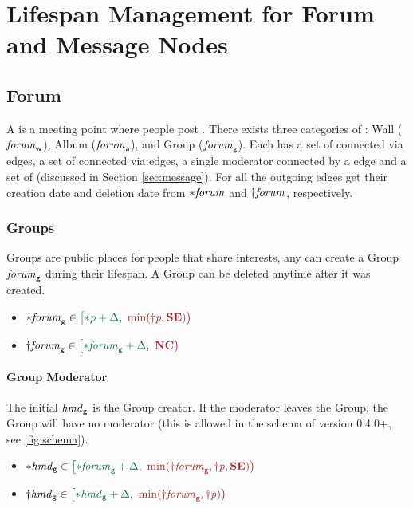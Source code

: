 
\section{Lifespan Management for Forum and Message Nodes}

\subsection{Forum}
\label{sec:forum}
\label{sec:hasModerator}

A \tForum is a meeting point where people post \tMessages.
There exists three categories of \tForums:
Wall ($\mathit{forum}_\textsf{w}$),
Album ($\mathit{forum}_\textsf{a}$),
and Group ($\mathit{forum}_\textsf{g}$).
Each \tForum has a set of \tPersons connected via \tHasMember edges, a set of \tTags connected via \tHasTag edges, a single moderator connected by a \tHasModerator edge and a set of \tMessages (discussed in Section \ref{sec:message}).
For all \tForums the outgoing \tHasTag edges get their creation date and deletion date from ${\ast}\mathit{\mathit{forum}}$ and ${\dagger}\mathit{\mathit{forum}}$, respectively.

\subsubsection{Groups}
Groups are public places for people that share interests, any \tPerson can create a Group $\mathit{forum}_\textsf{g}$ during their lifespan. A Group can be deleted anytime after it was created.
\begin{itemize}
    \item $\varc{\eForum}_{\mathsf{g}} \in \interval{\varc{\ePerson} + \Delta}{\min (\vard{\ePerson}, \xSE)}$
    \item $\vard{\eForum}_{\mathsf{g}} \in \interval{\varc{\eForum}_{\mathsf{g}} + \Delta}{\xNC}$
\end{itemize}

\paragraph{Group Moderator}
The initial \tHasModerator $\mathit{hmd}_{\mathsf{g}}$ is the Group creator. If the moderator leaves the Group, the Group will have no moderator (this is allowed in the schema of version 0.4.0+, see \autoref{fig:schema}).
\begin{itemize}
\item $\varc{\eHasModerator}_{\mathsf{g}} \in \interval{\varc{\eForum}_{\mathsf{g}} + \Delta}{\min (\vard{\eForum}_{\mathsf{g}}, \vard{\ePerson}, \xSE)}$
\item $\vard{\eHasModerator}_{\mathsf{g}} \in \interval{ \varc{\eHasModerator}_{\mathsf{g}} + \Delta}{\min (\vard{\eForum}_{\mathsf{g}}, \vard{\ePerson})}$ %
\end{itemize}

